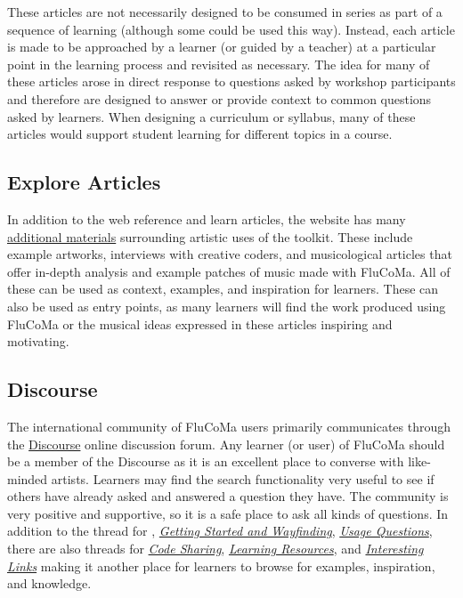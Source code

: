 \documentclass{article}
\begin{document}
These articles are not necessarily designed to be consumed in series as
part of a sequence of learning (although some could be used this way).
Instead, each article is made to be approached by a learner (or guided
by a teacher) at a particular point in the learning process and
revisited as necessary. The idea for many of these articles arose in
direct response to questions asked by workshop participants and
therefore are designed to answer or provide context to common questions
asked by learners. When designing a curriculum or syllabus, many of these
articles would support student learning for different topics in a
course.

\subsection{Explore Articles}\label{explore-articles}

In addition to the web reference and learn articles, the website has
many \href{https://learn.flucoma.org/explore/}{additional materials}
surrounding artistic uses of the toolkit. These include example
artworks, interviews with creative coders, and musicological articles
that offer in-depth analysis and example patches of music made with
FluCoMa. All of these can be used as context, examples, and inspiration
for learners. These can also be used as entry points, as many learners
will find the work produced using FluCoMa or the musical ideas expressed
in these articles inspiring and motivating.

\subsection{Discourse}\label{discourse}

The international community of FluCoMa users primarily communicates
through the \href{https://discourse.flucoma.org/}{Discourse} online
discussion forum. Any learner (or user) of FluCoMa should be a member of
the Discourse as it is an excellent place to converse with like-minded
artists. Learners may find the search functionality very useful to see
if others have already asked and answered a question they have. The
community is very positive and supportive, so it is a safe place to ask
all kinds of questions. In addition to the thread for
, \href{https://discourse.flucoma.org/c/getting-started-and-wayfinding}{\emph{Getting Started and Wayfinding}}, 
\href{https://discourse.flucoma.org/c/usage-questions}{\emph{Usage Questions}}, there are also threads for
\href{https://discourse.flucoma.org/c/code-sharing}{\emph{Code Sharing}},
\href{https://discourse.flucoma.org/c/learning-resources}{\emph{Learning Resources}}, and
\href{https://discourse.flucoma.org/c/interesting-links}{\emph{Interesting Links}} 
making it another place for learners to browse for examples,
inspiration, and knowledge.
\end{document}
